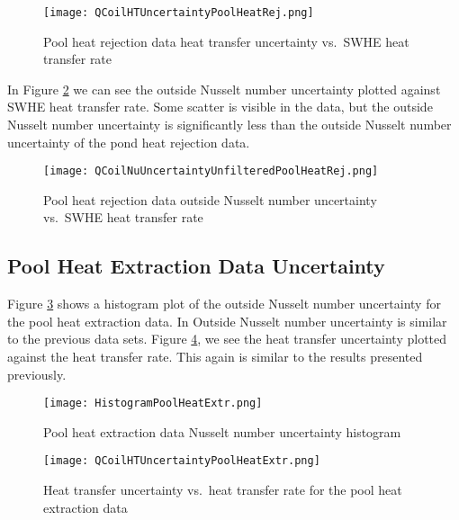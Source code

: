 \begin{figure}
	\centering
	\texttt{[image: QCoilHTUncertaintyPoolHeatRej.png]}
	\caption{Pool heat rejection data heat transfer uncertainty vs.\ SWHE heat transfer rate}
	\label{fig:ExpResult:Uncertainty:PoolHeatRej:QCoilHTUncertainty}
\end{figure}

In Figure \ref{fig:ExpResult:Uncertainty:PoolHeatRej:QCoilNuUncertaintyUnfilteredPoolHeatRej} we can see the outside Nusselt number uncertainty plotted against SWHE heat transfer rate. Some scatter is visible in the data, but the outside Nusselt number uncertainty is significantly less than the outside Nusselt number uncertainty of the pond heat rejection data. 

\begin{figure}
	\centering
	\texttt{[image: QCoilNuUncertaintyUnfilteredPoolHeatRej.png]}
	\caption{Pool heat rejection data outside Nusselt number uncertainty vs.\ SWHE heat transfer rate}	\label{fig:ExpResult:Uncertainty:PoolHeatRej:QCoilNuUncertaintyUnfilteredPoolHeatRej}
\end{figure}


\subsection{Pool Heat Extraction Data Uncertainty}
\label{subsec:ExpResult:Uncertainty:PoolExtr}

Figure \ref{fig:ExpResult:Uncertainty:PoolHeatExtr:HistogramPoolHeatExtr} shows a histogram plot of the outside Nusselt number uncertainty for the pool heat extraction data. In Outside Nusselt number uncertainty is similar to the previous data sets. Figure \ref{fig:ExpResult:Uncertainty:PoolHeatExtr:QCoilHTUncertainty}, we see the heat transfer uncertainty plotted against the heat transfer rate. This again is similar to the results presented previously.

\begin{figure}
	\centering
	\texttt{[image: HistogramPoolHeatExtr.png]}
	\caption{Pool heat extraction data Nusselt number uncertainty histogram}
	\label{fig:ExpResult:Uncertainty:PoolHeatExtr:HistogramPoolHeatExtr}
\end{figure}

\begin{figure}
	\centering
	\texttt{[image: QCoilHTUncertaintyPoolHeatExtr.png]}
	\caption{Heat transfer uncertainty vs.\ heat transfer rate for the pool heat extraction data}
	\label{fig:ExpResult:Uncertainty:PoolHeatExtr:QCoilHTUncertainty}
\end{figure}

